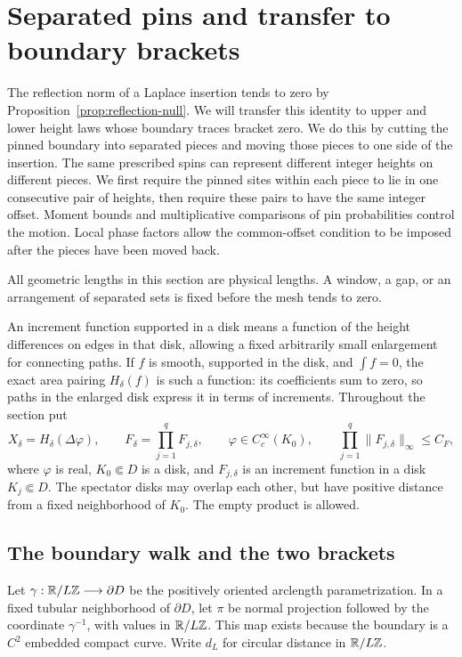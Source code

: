 \section{Separated pins and transfer to boundary brackets}\label{sec:pins}

The reflection norm of a Laplace insertion tends to zero by
Proposition~\ref{prop:reflection-null}.  We will transfer this identity to
upper and lower height laws whose boundary traces bracket zero.  We do
this by cutting the pinned boundary into separated pieces and moving
those pieces to one side of the insertion.  The same prescribed spins
can represent different integer heights on different pieces.  We first
require the pinned sites within each piece to lie in one consecutive
pair of heights, then require these pairs to have the same integer
offset.  Moment bounds and multiplicative comparisons of pin
probabilities control the motion.  Local phase factors allow the
common-offset condition to be imposed after the pieces have been moved
back.

All geometric lengths in this section are physical lengths.  A window,
a gap, or an arrangement of separated sets is fixed before the mesh
tends to zero.

An increment function supported in a disk means a function of the height
differences on edges in that disk, allowing a fixed arbitrarily small
enlargement for connecting paths.  If $f$ is smooth, supported in the disk,
and $\int f=0$, the exact area pairing $H_\delta(f)$ is such a function:
its coefficients sum to zero, so paths in the enlarged disk express it
in terms of increments.  Throughout the section put
\begin{equation}\label{pins:insertion-data}
 X_\delta=H_\delta(\Delta\varphi),\qquad
 F_\delta=\prod_{j=1}^q F_{j,\delta},\qquad
 \varphi\in C_c^\infty(K_0),\qquad
 \prod_{j=1}^q\|F_{j,\delta}\|_\infty\le C_F,
\end{equation}
where $\varphi$ is real, $K_0\Subset D$ is a disk, and $F_{j,\delta}$ is
an increment function in a disk $K_j\Subset D$.  The spectator disks may
overlap each other, but have positive distance from a fixed neighborhood
of $K_0$.  The empty product is allowed.

\subsection{The boundary walk and the two brackets}

Let $\gamma:\mathbb R/L\mathbb Z\longrightarrow\partial D$ be the positively oriented
arclength parametrization.  In a fixed tubular neighborhood of
$\partial D$, let $\pi$ be normal projection followed by the coordinate
$\gamma^{-1}$, with values in $\mathbb R/L\mathbb Z$.  This map exists because the
boundary is a $C^2$ embedded compact curve.  Write $d_L$ for circular
distance in $\mathbb R/L\mathbb Z$.

